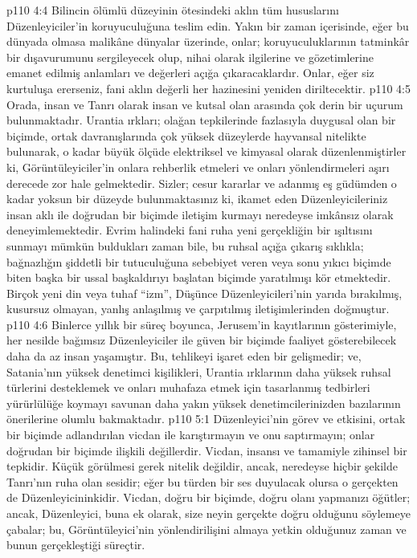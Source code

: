 \vs p110 4:4 Bilincin ölümlü düzeyinin ötesindeki aklın tüm hususlarını Düzenleyiciler’in koruyuculuğuna teslim edin. Yakın bir zaman içerisinde, eğer bu dünyada olmasa malikâne dünyalar üzerinde, onlar; koruyuculuklarının tatminkâr bir dışavurumunu sergileyecek olup, nihai olarak ilgilerine ve gözetimlerine emanet edilmiş anlamları ve değerleri açığa çıkaracaklardır. Onlar, eğer siz kurtuluşa ererseniz, fani aklın değerli her hazinesini yeniden diriltecektir.
\vs p110 4:5 Orada, insan ve Tanrı olarak insan ve kutsal olan arasında çok derin bir uçurum bulunmaktadır. Urantia ırkları; olağan tepkilerinde fazlasıyla duygusal olan bir biçimde, ortak davranışlarında çok yüksek düzeylerde hayvansal nitelikte bulunarak, o kadar büyük ölçüde elektriksel ve kimyasal olarak düzenlenmiştirler ki, Görüntüleyiciler’in onlara rehberlik etmeleri ve onları yönlendirmeleri aşırı derecede zor hale gelmektedir. Sizler; cesur kararlar ve adanmış eş güdümden o kadar yoksun bir düzeyde bulunmaktasınız ki, ikamet eden Düzenleyicileriniz insan aklı ile doğrudan bir biçimde iletişim kurmayı neredeyse imkânsız olarak deneyimlemektedir. Evrim halindeki fani ruha yeni gerçekliğin bir ışıltısını sunmayı mümkün buldukları zaman bile, bu ruhsal açığa çıkarış sıklıkla; bağnazlığın şiddetli bir tutuculuğuna sebebiyet veren veya sonu yıkıcı biçimde biten başka bir ussal başkaldırıyı başlatan biçimde yaratılmışı kör etmektedir. Birçok yeni din veya tuhaf “izm”, Düşünce Düzenleyicileri’nin yarıda bırakılmış, kusursuz olmayan, yanlış anlaşılmış ve çarpıtılmış iletişimlerinden doğmuştur.
\vs p110 4:6 Binlerce yıllık bir süreç boyunca, Jerusem’in kayıtlarının gösterimiyle, her nesilde bağımsız Düzenleyiciler ile güven bir biçimde faaliyet gösterebilecek daha da az insan yaşamıştır. Bu, tehlikeyi işaret eden bir gelişmedir; ve, Satania’nın yüksek denetimci kişilikleri, Urantia ırklarının daha yüksek ruhsal türlerini desteklemek ve onları muhafaza etmek için tasarlanmış tedbirleri yürürlülüğe koymayı savunan daha yakın yüksek denetimcilerinizden bazılarının önerilerine olumlu bakmaktadır.
\vs p110 5:1 Düzenleyici’nin görev ve etkisini, ortak bir biçimde adlandırılan vicdan ile karıştırmayın ve onu saptırmayın; onlar doğrudan bir biçimde ilişkili değillerdir. Vicdan, insansı ve tamamiyle zihinsel bir tepkidir. Küçük görülmesi gerek nitelik değildir, ancak, neredeyse hiçbir şekilde Tanrı’nın ruha olan sesidir; eğer bu türden bir ses duyulacak olursa o gerçekten de Düzenleyicininkidir. Vicdan, doğru bir biçimde, doğru olanı yapmanızı öğütler; ancak, Düzenleyici, buna ek olarak, size neyin gerçekte doğru olduğunu söylemeye çabalar; bu, Görüntüleyici’nin yönlendirilişini almaya yetkin olduğunuz zaman ve bunun gerçekleştiği süreçtir.
